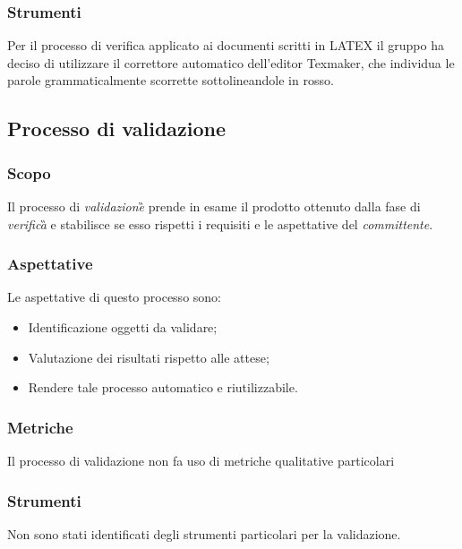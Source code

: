 				\subsubsection{Strumenti}
				Per il processo di verifica applicato ai documenti scritti in LATEX il gruppo ha deciso di utilizzare il
				correttore automatico dell’editor Texmaker, che individua le parole grammaticalmente scorrette sottolineandole in rosso.
		\subsection{Processo di validazione}
			\subsubsection{Scopo}
				Il processo di \emph{validazione}\G{} prende in esame il prodotto ottenuto dalla fase di \emph{verifica}\G{} e stabilisce se esso rispetti i requisiti e le aspettative del \emph{committente}.
			\subsubsection{Aspettative}
				Le aspettative di questo processo sono:
					\begin{itemize}
						\item Identificazione oggetti da validare;
						\item Valutazione dei risultati rispetto alle attese;
						\item Rendere tale processo automatico e riutilizzabile.
					\end{itemize}
			\subsubsection{Metriche}
			Il processo di validazione non fa uso di metriche qualitative particolari
			\subsubsection{Strumenti}
			Non sono stati identificati degli strumenti particolari per la validazione.
